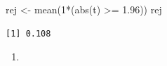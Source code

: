 \documentclass[
  letterpaper,
  DIV=11,
  numbers=noendperiod]{scrreprt}
\newenvironment{Shaded}{\begin{snugshade}}{\end{snugshade}}
\newcommand{\DecValTok}[1]{\textcolor[rgb]{0.68,0.00,0.00}{#1}}
\newcommand{\FloatTok}[1]{\textcolor[rgb]{0.68,0.00,0.00}{#1}}
\newcommand{\FunctionTok}[1]{\textcolor[rgb]{0.28,0.35,0.67}{#1}}
\newcommand{\NormalTok}[1]{\textcolor[rgb]{0.00,0.23,0.31}{#1}}
\newcommand{\OtherTok}[1]{\textcolor[rgb]{0.00,0.23,0.31}{#1}}
\newcommand{\SpecialCharTok}[1]{\textcolor[rgb]{0.37,0.37,0.37}{#1}}
\providecommand{\tightlist}{%
  \setlength{\itemsep}{0pt}\setlength{\parskip}{0pt}}\usepackage{longtable,booktabs,array}
\begin{document}
\begin{Shaded}
\begin{Highlighting}[]
\NormalTok{rej }\OtherTok{\textless{}{-}} \FunctionTok{mean}\NormalTok{(}\DecValTok{1}\SpecialCharTok{*}\NormalTok{(}\FunctionTok{abs}\NormalTok{(t) }\SpecialCharTok{\textgreater{}=} \FloatTok{1.96}\NormalTok{))}
\NormalTok{rej}
\end{Highlighting}
\end{Shaded}

\begin{verbatim}
[1] 0.108
\end{verbatim}

\begin{enumerate}
\def\labelenumi{\arabic{enumi}.}
\setcounter{enumi}{3}
\tightlist
\item
\end{enumerate}
\end{document}
